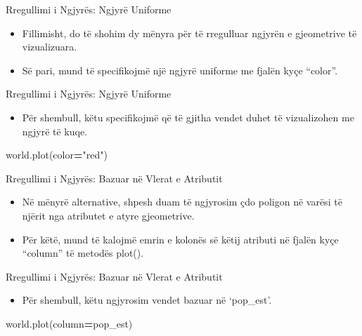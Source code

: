 \documentclass[
  ignorenonframetext,
]{beamer}
\newenvironment{Shaded}{\begin{snugshade}}{\end{snugshade}}
\newcommand{\NormalTok}[1]{#1}
\newcommand{\OperatorTok}[1]{\textcolor[rgb]{0.81,0.36,0.00}{\textbf{#1}}}
\newcommand{\StringTok}[1]{\textcolor[rgb]{0.31,0.60,0.02}{#1}}
\providecommand{\tightlist}{%
  \setlength{\itemsep}{0pt}\setlength{\parskip}{0pt}}
\begin{document}
\begin{frame}{Rregullimi i Ngjyrës: Ngjyrë Uniforme}
\protect\hypertarget{rregullimi-i-ngjyruxebs-ngjyruxeb-uniforme}{}
\begin{itemize}
\item
  Fillimisht, do të shohim dy mënyra për të rregulluar ngjyrën e
  gjeometrive të vizualizuara.
\item
  Së pari, mund të specifikojmë një ngjyrë uniforme me fjalën kyçe
  ``color''.
\end{itemize}
\end{frame}

\begin{frame}[fragile]{Rregullimi i Ngjyrës: Ngjyrë Uniforme}
\protect\hypertarget{rregullimi-i-ngjyruxebs-ngjyruxeb-uniforme-1}{}
\begin{itemize}
\tightlist
\item
  Për shembull, këtu specifikojmë që të gjitha vendet duhet të
  vizualizohen me ngjyrë të kuqe.
\end{itemize}


\begin{Shaded}
\begin{Highlighting}[]
\NormalTok{world.plot(color}\OperatorTok{=}\StringTok{"red"}\NormalTok{)}
\end{Highlighting}
\end{Shaded}
\end{frame}

\begin{frame}{Rregullimi i Ngjyrës: Bazuar në Vlerat e Atributit}
\protect\hypertarget{rregullimi-i-ngjyruxebs-bazuar-nuxeb-vlerat-e-atributit}{}
\begin{itemize}
\item
  Në mënyrë alternative, shpesh duam të ngjyrosim çdo poligon në varësi
  të njërit nga atributet e atyre gjeometrive.
\item
  Për këtë, mund të kalojmë emrin e kolonës së këtij atributi në fjalën
  kyçe ``column'' të metodës plot().
\end{itemize}
\end{frame}

\begin{frame}[fragile]{Rregullimi i Ngjyrës: Bazuar në Vlerat e
Atributit}
\protect\hypertarget{rregullimi-i-ngjyruxebs-bazuar-nuxeb-vlerat-e-atributit-1}{}
\begin{itemize}
\tightlist
\item
  Për shembull, këtu ngjyrosim vendet bazuar në `pop\_est'.
\end{itemize}


\begin{Shaded}
\begin{Highlighting}[]
\NormalTok{world.plot(column}\OperatorTok{=}\StringTok{\textquotesingle{}pop\_est\textquotesingle{}}\NormalTok{)}
\end{Highlighting}
\end{Shaded}
\end{frame}
\end{document}
